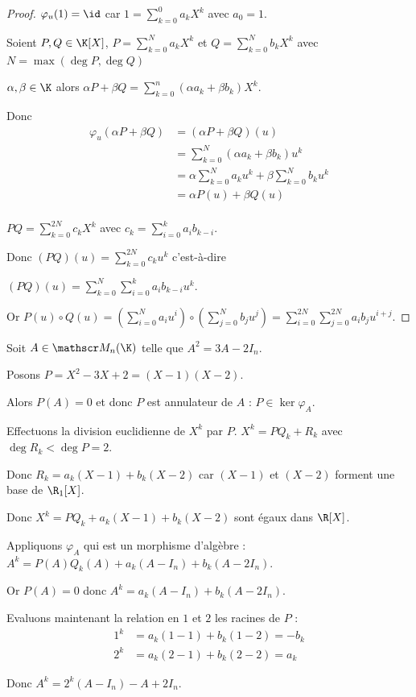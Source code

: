 \begin{proof}
    $\varphi_u(1) = \id$ car $\displaystyle 1 = \sum_{k = 0 }^{ 0 } a_k X^k$ avec $a_0 = 1$.

    Soient $P, Q \in \K[X]$, $\displaystyle P = \sum_{k = 0 }^{ N } a_k X^k$ et $\displaystyle Q = \sum_{k = 0 }^{ N} b_k X^k$
    avec $N = \max(\deg P, \deg Q)$ 

    $\alpha, \beta \in \K$ alors $\displaystyle\alpha P + \beta Q = \sum_{k = 0 }^{n } (\alpha a_k + \beta b_k) X^k$.

    Donc 
    \begin{align}
        \varphi_u(\alpha P + \beta Q) & = (\alpha P + \beta Q)(u) \\
        & = \sum_{k = 0 }^{ N } (\alpha a_k + \beta b_k) u^k \\
        & = \alpha \sum_{k = 0 }^{ N } a_k u^k + \beta \sum_{k = 0 }^{ N } b_k u^k \\
        & = \alpha P(u) + \beta Q(u) \\
    \end{align}

    $\displaystyle PQ = \sum_{k = 0 }^{ 2N } c_k X^k$ avec $\displaystyle c_k = \sum_{i = 0 }^{ k } a_i b_{k - i}$.

    Donc $\displaystyle (PQ)(u) = \sum_{k = 0 }^{ 2N } c_k u^k$ c'est-à-dire 

    $\displaystyle (PQ)(u) = \sum_{k = 0 }^{ N} \sum_{i = 0 }^{k } a_i b_{k - i} u^k$.

    Or $\displaystyle P(u) \circ Q(u) = (\sum_{i = 0 }^{ N } a_i u^i)\circ( \sum_{j = 0 }^{ N } b_j u^j)
    = \sum_{i = 0 }^{ 2N} \sum_{j = 0 }^{2N } a_i b_j u^{i + j}$.
\end{proof}



\begin{exemple}
    Soit $A \in \mathscr M_n(\K)$ telle que $A^2 = 3A - 2 I_n$. 

    Posons $P = X^2 - 3X + 2 = (X - 1)(X - 2)$.

    Alors $P(A) = 0$ et donc $P$ est annulateur de $A$ : $P \in \ker \varphi_A$.

    Effectuons la division euclidienne de $X^k$ par $P$. $X^k = PQ_k + R_k$ avec 
    $\deg R_k < \deg P = 2$.

    Donc $R_k = a_k(X - 1) + b_k (X - 2)$ car $(X - 1)$ et $(X - 2)$ forment une base de $\R_1[X]$.

    Donc $X^k = P Q_k + a_k (X - 1) + b_k (X - 2)$ sont égaux dans $\R[X]$. 

    Appliquons $\varphi_A$ qui est un morphisme d'algèbre : $A^k = P(A) Q_k(A) + a_k (A - I_n) + b_k (A - 2 I_n)$.

    Or $P(A) = 0$ donc $A^k = a_k (A - I_n) + b_k (A - 2 I_n)$.

    Evaluons maintenant la relation en $1$ et $2$ les racines de $P$ : 
    \begin{align}
        1^k & = a_k (1 - 1) + b_k (1 - 2) = -b_k \\
        2^k & = a_k (2 - 1) + b_k (2 - 2) = a_k
    \end{align}

    Donc $A^k = 2^k (A - I_n) - A + 2 I_n$.
\end{exemple}


